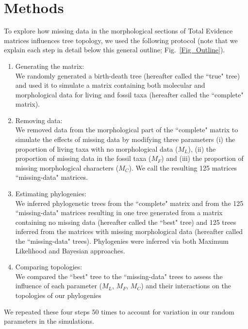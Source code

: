 \documentclass[10pt,letterpaper]{article}
\begin{document}
%
%
 
\section*{Methods}
To explore how missing data in the morphological sections of Total Evidence matrices influences tree topology, we used the following protocol (note that we explain each step in detail below this general outline; Fig.~\ref{Fig_Outline}).
\begin{enumerate}
\item{Generating the matrix:} \label{step:generate_matrix} \\
We randomly generated a birth-death tree (hereafter called the ``true" tree) and used it to simulate a matrix containing both molecular and morphological data for living and fossil taxa (hereafter called the ``complete" matrix).
\item{Removing data:} \label{step:remove_data} \\
We removed data from the morphological part of the ``complete" matrix to simulate the effects of missing data by modifying three parameters (i) the proportion of living taxa with no morphological data ($M_{L}$), (ii) the proportion of missing data in the fossil taxa ($M_{F}$) and (iii) the proportion of missing morphological characters ($M_{C}$). We call the resulting 125 matrices ``missing-data" matrices.
\item{Estimating phylogenies:} \label{step:build_phylo} \\
We inferred phylogenetic trees from the ``complete" matrix and from the 125 ``missing-data" matrices resulting in one tree generated from a matrix containing no missing data (hereafter called the ``best" tree) and 125 trees inferred from the matrices with missing morphological data (hereafter called the ``missing-data" trees). Phylogenies were inferred via both Maximum Likelihood and Bayesian approaches.
\item{Comparing topologies:} \label{step:compare_topo} \\
We compared the ``best" tree to the ``missing-data" trees to assess the influence of each parameter ($M_{L}$, $M_{F}$, $M_{C}$) and their interactions on the topologies of our phylogenies
\end{enumerate}
We repeated these four steps 50 times to account for variation in our random parameters in the simulations.
\end{document}
